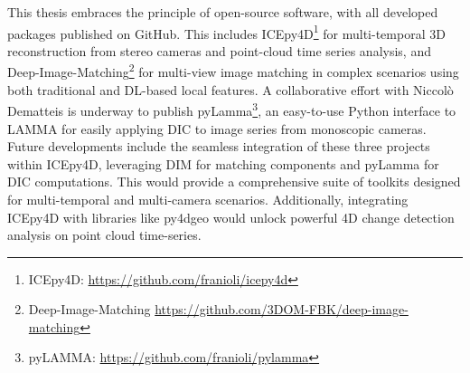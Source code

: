 This thesis embraces the principle of open-source software, with all developed packages published on GitHub.
This includes ICEpy4D\footnote{ICEpy4D: \url{https://github.com/franioli/icepy4d}} for multi-temporal 3D reconstruction from stereo cameras and point-cloud time series analysis, and Deep-Image-Matching\footnote{Deep-Image-Matching \url{https://github.com/3DOM-FBK/deep-image-matching}} for multi-view image matching in complex scenarios using both traditional and DL-based local features.  
A collaborative effort with Niccolò Dematteis is underway to publish pyLamma\footnote{pyLAMMA: \url{https://github.com/franioli/pylamma}}, an easy-to-use Python interface to LAMMA \cite{Dematteis2022} for easily applying DIC to image series from monoscopic cameras. 
Future developments include the seamless integration of these three projects within ICEpy4D, leveraging DIM for matching components and pyLamma for DIC computations. 
This would provide a comprehensive suite of toolkits designed for multi-temporal and multi-camera scenarios. 
Additionally, integrating ICEpy4D with libraries like py4dgeo \cite{Anders2021_py4dgeo, Winiwarter2023_kalman} would unlock powerful 4D change detection analysis on point cloud time-series.



\makechapterbibliography{}